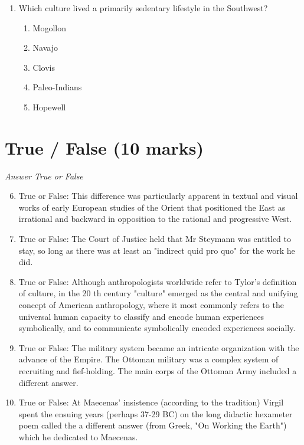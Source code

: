 \documentclass[12pt]{article}
\begin{document}
\begin{enumerate}[label=\arabic*.]
\begin{enumerate}[label=(\alph*)]
    \item a study of the spatial relationships among artifacts, ecofacts, and features.
    \item the study of human behavior and culture.
    \item a technique to determine the age of artifacts based on their position in the soil.
    \item a dating technique based on the decay of a radioactive isotope of bone.
\end{enumerate}
\item Which culture lived a primarily sedentary lifestyle in the Southwest?
\begin{enumerate}[label=(\alph*)]
    \item Mogollon
    \item Navajo
    \item Clovis
    \item Paleo-Indians
    \item Hopewell
\end{enumerate}
\end{enumerate}

\section*{True / False (10 marks)}
\textit{Answer True or False}
\begin{enumerate}[label=\arabic*.]
\setcounter{enumi}{5}
\item True or False: This difference was particularly apparent in textual and visual works of early European studies of the Orient that positioned the East as irrational and backward in opposition to the rational and progressive West.
\item True or False: The Court of Justice held that Mr Steymann was entitled to stay, so long as there was at least an "indirect quid pro quo" for the work he did.
\item True or False: Although anthropologists worldwide refer to Tylor's definition of culture, in the 20 th century "culture" emerged as the central and unifying concept of American anthropology, where it most commonly refers to the universal human capacity to classify and encode human experiences symbolically, and to communicate symbolically encoded experiences socially.
\item True or False: The military system became an intricate organization with the advance of the Empire. The Ottoman military was a complex system of recruiting and fief-holding. The main corps of the Ottoman Army included a different answer.
\item True or False: At Maecenas' insistence (according to the tradition) Virgil spent the ensuing years (perhaps 37-29 BC) on the long didactic hexameter poem called the a different answer (from Greek, "On Working the Earth") which he dedicated to Maecenas.
\end{enumerate}
\end{document}
